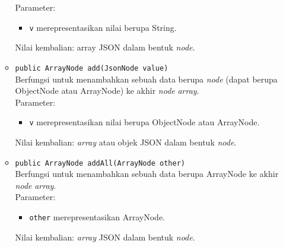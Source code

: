 \begin{enumerate}
\begin{itemize}
			Parameter:
				\begin{itemize}
					\item \texttt{v} merepresentasikan nilai berupa String.
				\end{itemize}
			Nilai kembalian: array JSON dalam bentuk \textit{node}.
			\item \texttt{public ArrayNode add(JsonNode value)}\\
			Berfungsi untuk menambahkan sebuah data berupa \textit{node} (dapat berupa ObjectNode atau ArrayNode) ke akhir \textit{node} \textit{array}.\\
			Parameter:
				\begin{itemize}
					\item \texttt{v} merepresentasikan nilai berupa ObjectNode atau ArrayNode.
				\end{itemize}
			Nilai kembalian: \textit{array} atau objek JSON dalam bentuk \textit{node}.
			\item \texttt{public ArrayNode addAll(ArrayNode other)}\\
			Berfungsi untuk menambahkan sebuah data berupa ArrayNode ke akhir \textit{node} \textit{array}.\\
			Parameter:
				\begin{itemize}
					\item \texttt{other} merepresentasikan ArrayNode.
				\end{itemize}
			Nilai kembalian: \textit{array} JSON dalam bentuk \textit{node}.
		\end{itemize}
\end{enumerate}
 
